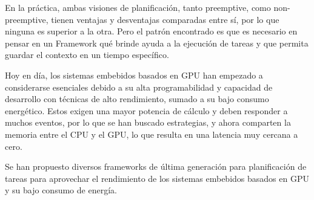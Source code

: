 En la práctica, ambas visiones de planificación, tanto preemptive, como non-preemptive, tienen ventajas y desventajas comparadas entre sí, por lo que ninguna es superior a la otra. Pero el patrón encontrado es que es necesario en pensar en un Framework qué brinde ayuda a la ejecución de tareas y que permita guardar el contexto en un tiempo específico. 

Hoy en día, los sistemas embebidos basados en GPU han empezado a considerarse esenciales debido a su alta programabilidad y capacidad de desarrollo con técnicas de alto rendimiento, sumado a su bajo consumo energético. Estos exigen una mayor potencia de cálculo y deben responder a muchos eventos, por lo que se han buscado estrategias, y ahora comparten la memoria entre el CPU y el GPU, lo que resulta en una latencia muy cercana a cero.

Se han propuesto diversos frameworks de última generación para planificación de tareas para aprovechar el rendimiento de los sistemas embebidos basados en GPU y su bajo consumo de energía.






